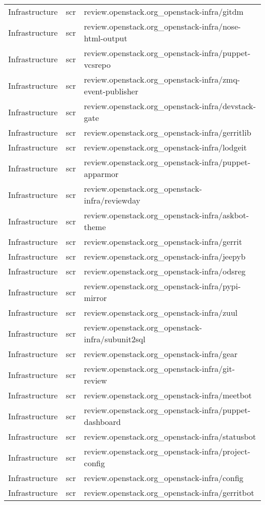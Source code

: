 \begin{center}
\begin{longtable}{|p{4cm}|p{1cm}|p{10cm}|}
Infrastructure&scr&review.openstack.org\_openstack-infra/gitdm\\ 
Infrastructure&scr&review.openstack.org\_openstack-infra/nose-html-output\\ 
Infrastructure&scr&review.openstack.org\_openstack-infra/puppet-vcsrepo\\ 
Infrastructure&scr&review.openstack.org\_openstack-infra/zmq-event-publisher\\ 
Infrastructure&scr&review.openstack.org\_openstack-infra/devstack-gate\\ 
Infrastructure&scr&review.openstack.org\_openstack-infra/gerritlib\\ 
Infrastructure&scr&review.openstack.org\_openstack-infra/lodgeit\\ 
Infrastructure&scr&review.openstack.org\_openstack-infra/puppet-apparmor\\ 
Infrastructure&scr&review.openstack.org\_openstack-infra/reviewday\\ 
Infrastructure&scr&review.openstack.org\_openstack-infra/askbot-theme\\ 
Infrastructure&scr&review.openstack.org\_openstack-infra/gerrit\\ 
Infrastructure&scr&review.openstack.org\_openstack-infra/jeepyb\\ 
Infrastructure&scr&review.openstack.org\_openstack-infra/odsreg\\ 
Infrastructure&scr&review.openstack.org\_openstack-infra/pypi-mirror\\ 
Infrastructure&scr&review.openstack.org\_openstack-infra/zuul\\ 
Infrastructure&scr&review.openstack.org\_openstack-infra/subunit2sql\\ 
Infrastructure&scr&review.openstack.org\_openstack-infra/gear\\ 
Infrastructure&scr&review.openstack.org\_openstack-infra/git-review\\ 
Infrastructure&scr&review.openstack.org\_openstack-infra/meetbot\\ 
Infrastructure&scr&review.openstack.org\_openstack-infra/puppet-dashboard\\ 
Infrastructure&scr&review.openstack.org\_openstack-infra/statusbot\\ 
Infrastructure&scr&review.openstack.org\_openstack-infra/project-config\\ 
Infrastructure&scr&review.openstack.org\_openstack-infra/config\\ 
Infrastructure&scr&review.openstack.org\_openstack-infra/gerritbot\\ 

\end{longtable}
\end{center}
